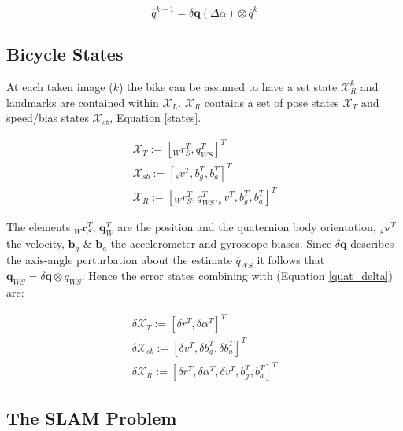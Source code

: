 \documentclass[a4paper,11pt,notitlepage]{article}
\begin{document}
\begin{equation}
\label{quat_opt}
\overline{q}^{k+1} = \delta \textbf{q}(\Delta \alpha) \otimes \overline{q}^{k}
\end{equation}

\subsection{Bicycle States}

At each taken image ($k$) the bike can be assumed to have a set state $\mathcal{X}_{R}^{k}$ and landmarks are contained within $\mathcal{X}_{L}$. $\mathcal{X}_{R}$ contains a set of pose states $\mathcal{X}_{T}$ and speed/bias states $\mathcal{X}_{sb}$, Equation \ref{states}.

\begin{equation}
\begin{aligned}
\label{states}
\mathcal{X}_{T} := [ _{W}r_{S}^{T},q_{WS}^{T} ]^{T} \\
\mathcal{X}_{sb} := [ _{s}v^{T},b_{g}^{T}, b_{a}^{T} ]^{T} \\
\mathcal{X}_{R} := [ _{W}r_{S}^{T},q_{WS}^{T},_{s}v^{T},b_{g}^{T}, b_{a}^{T}]^{T}
\end{aligned}
\end{equation}

The elements $_{W}\textbf{r}_{S}^{T}$, $\textbf{{q}}_{W}^{T}$ are the position and the quaternion body orientation, $_{s}\textbf{{v}}^{T}$ the velocity, $\textbf{{b}}_{g}$ \& $\textbf{{b}}_{a}$ the accelerometer and gyroscope biases. Since $\delta \textbf{q}$ describes the axis-angle perturbation about the estimate $\overline{q}_{WS}$ it follows that $\textbf{q}_{WS} = \delta \textbf{q} \otimes \overline{q}_{WS}$. Hence the error states combining with (Equation \ref{quat_delta}) are:

\begin{equation}
\begin{aligned}
\label{states}
\delta \mathcal{X}_{T} := [ \delta r^{T}, \delta \alpha^{T} ]^{T} \\
\delta \mathcal{X}_{sb} := [ \delta v^{T}, \delta b_{g}^{T},\delta b_{a}^{T} ]^{T} \\
\delta \mathcal{X}_{R} := [ \delta r^{T}, \delta \alpha^{T}, \delta v^{T},b_{g}^{T}, b_{a}^{T}]^{T}
\end{aligned}
\end{equation}


\subsection{The SLAM Problem}
\end{document}
